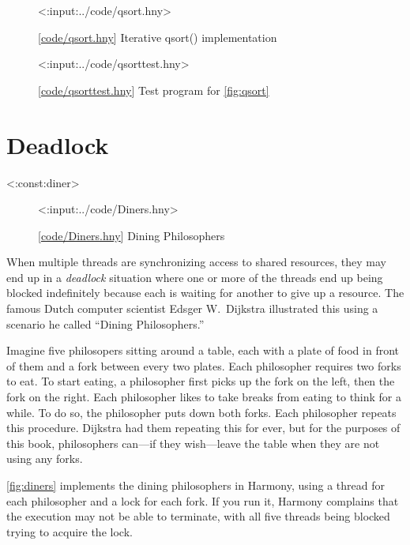 \documentclass{report}
\newcommand{\harmonylink}[1]{%
[\href{https://harmony.cs.cornell.edu/#1}{\underline{#1}}]%
}
\newenvironment{code}{
\tcolorbox
}{
\endtcolorbox
}
\begin{document}
\begin{figure}
\begin{code}
<{:input:../code/qsort.hny}>
\end{code}
\caption{\harmonylink{code/qsort.hny} Iterative qsort() implementation}
\label{fig:qsort}
\end{figure}

\begin{figure}
\begin{code}
<{:input:../code/qsorttest.hny}>
\end{code}
\caption{\harmonylink{code/qsorttest.hny} Test program for \autoref{fig:qsort}}
\label{fig:qsorttest}
\end{figure}

\chapter{Deadlock}
\label{ch:deadlock}
%

<{:const:diner}>

%

\begin{figure}
\begin{code}
<{:input:../code/Diners.hny}>
\end{code}
\caption{\harmonylink{code/Diners.hny} Dining Philosophers}
\label{fig:diners}
\end{figure}

When multiple threads are synchronizing access to shared resources, they
may end up in a \emph{deadlock} situation where one or more of the threads
end up being blocked indefinitely because each is waiting for another to give
up a resource.
The famous Dutch computer scientist Edsger W.~Dijkstra illustrated this using
a scenario he called ``Dining Philosophers.''
%

Imagine five philosopers sitting around a table, each with a plate of food in
front of them and a fork between every two plates.  Each philosopher requires
two forks to eat.  To start eating, a philosopher first picks up the fork on
the left, then the fork on the right.  Each philosopher likes to take breaks
from eating to think for a while.  To do so, the philosopher puts down both
forks.  Each philosopher repeats this procedure.  Dijkstra had them repeating
this for ever, but for the purposes of this book,
philosophers can---if they wish---leave the table when they are
not using any forks.

\autoref{fig:diners} implements the dining philosophers in Harmony, using a
thread for each philosopher and a lock for each fork.  If you
run it, Harmony complains that the execution may not be able to terminate,
with all five threads being blocked trying to acquire the lock.
\end{document}
